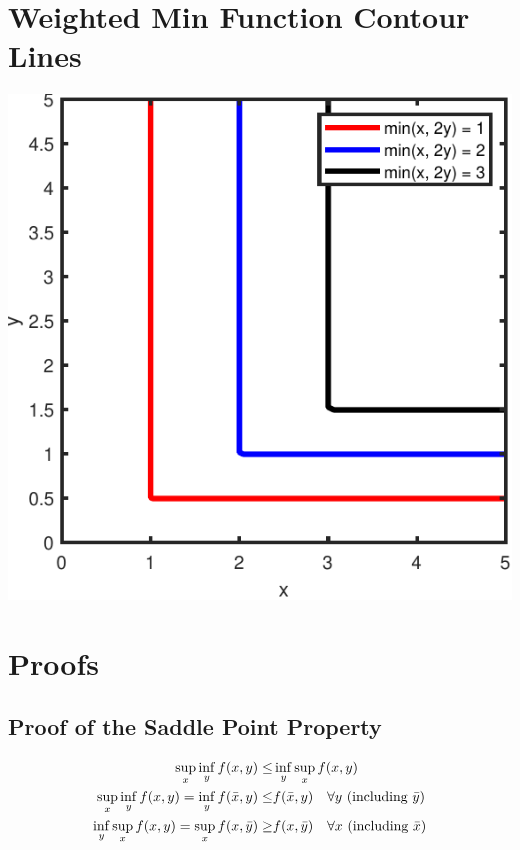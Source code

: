 \documentclass[english]{latex4ei/latex4ei_sheet}
\begin{document}
\section{Weighted Min Function Contour Lines}

\begin{sectionbox}
	\includegraphics[width=\textwidth]{img/minfunction.pdf}
\end{sectionbox}

\section{Proofs}

\begin{sectionbox}
	\subsection{Proof of the Saddle Point Property}
	
	\begin{align}
		\sup\limits_{x} \inf\limits_{y} f(x, y) \leq & \inf\limits_{y} \sup\limits_{x} f(x, y) \notag \\
		\sup\limits_{x} \inf\limits_{y} f(x, y) = \inf\limits_{y} f(\bar{x}, y) \leq & f(\bar{x}, y) \quad \forall y \text{  (including $\bar{y}$)} \notag\\
		\inf\limits_{y} \sup\limits_{x} f(x, y) = \sup\limits_{x} f(x, \bar{y}) \geq & f(x, \bar{y}) \quad \forall x \text{  (including $\bar{x}$)} \notag
	\end{align}
	
\end{sectionbox}
\end{document}
